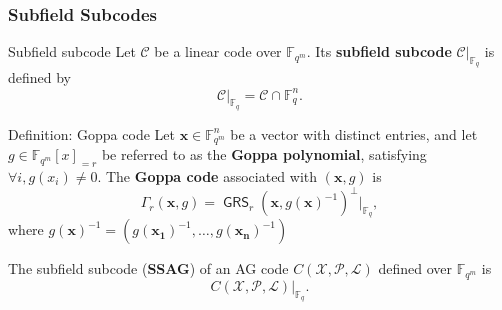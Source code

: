 \documentclass[
10pt, %
%
aspectratio=169, %
]{beamer}
\theoremstyle{plain}%
\theoremstyle{definition}
\theoremstyle{remark}
\newcommand{\calP}{\mathcal{P}}
\newcommand{\calL}{\mathcal{L}}
\newcommand{\calC}{\mathcal{C}}
\newcommand{\calX}{\mathcal{X}}
\newcommand{\fqm}{\mathbb{F}_{q^m}}
\newcommand{\fq}{\mathbb{F}_{q}}
\newcommand{\GRS}{\operatorname{\mathsf{GRS}}}
\begin{document}
\begin{frame}
	\frametitle{Subfield Subcodes}
	\begin{block}{Subfield subcode}
		Let $\calC$ be a linear code over $\fqm$.
		Its \textbf{subfield subcode} $\calC|_{\fq}$ is defined by 
		\vspace{-0.7em}
		\[\calC|_{\fq}=\calC \cap \mathbb{F}_q^n.\]
	\end{block}
	\begin{block}{Definition: Goppa code}
		Let $\mathbf{x} \in \fqm^n$ be a vector with distinct entries, and let $g \in \fqm [x]_{=r}$ be referred to as the \textbf{Goppa polynomial}, satisfying $\forall i, g(x_i)\neq 0$. The \textbf{Goppa code} associated with $(\mathbf{x}, g)$ is 	
		\vspace{-0.7em}
		 \[\Gamma_r(\mathbf{x},g)= \GRS_r(\mathbf{x},g(\mathbf{x})^{-1})^\perp|_{\fq},\]
		where $g(\mathbf{x})^{-1}=(g(\mathbf{x_1})^{-1},\dots,g(\mathbf{x_n})^{-1})$
	\end{block}
\begin{tcolorbox}[colback= white, colframe=palatinatepurple]
	The subfield subcode (\textbf{SSAG}) of an AG code $C(\calX,\calP,\calL)$ defined over $\fqm$ is
	\[C(\calX,\calP,\calL)|_{\fq}.\]
\end{tcolorbox}
\end{frame}
	
\end{document}
